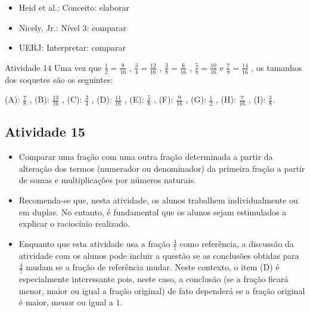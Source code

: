 \begin{multicols}{2}
\begin{itemize} %
    \item       Heid et al.: Conceito: elaborar
    \item       Nicely, Jr.: Nível 3: comparar
    \item       UERJ: Interpretar: comparar
\end{itemize} %

\begin{resposta*}{Atividade 14}
  Uma vez que   $\frac{1}{2} = \frac{8}{16}$  ,   $\frac{3}{4} = \frac{12}{16}$  
,   $\frac{3}{8} = \frac{6}{16}$  ,   $\frac{5}{8} = \frac{10}{16}$   e   
$\frac{7}{8} = \frac{14}{16}$  , os tamanhos dos soquetes são os seguintes:  
  
  (A):   $\frac{7}{8}$  ,  
  (B):   $\frac{13}{16}$  ,  
  (C):   $\frac{3}{4}$  ,   
  (D):   $\frac{11}{16}$  ,  
  (E):   $\frac{5}{8}$  ,  
  (F):   $\frac{9}{16}$  ,  
  (G):   $\frac{1}{2}$  ,  
  (H):   $\frac{7}{16}$  ,  
  (I):   $\frac{3}{8}$.  
\end{resposta*}



\subsection{Atividade 15}

\begin{itemize} %
    \item       Comparar uma fração com uma outra fração determinada a partir da 
alteração dos termos (numerador ou denominador) da primeira fração a partir de 
somas e multiplicações por números naturais.
\end{itemize} %
  
  
 
\begin{itemize} %
    \item       Recomenda-se que, nesta atividade, os alunos trabalhem 
individualmente ou em duplas. No entanto, é fundamental que os alunos sejam 
estimulados a explicar o raciocínio realizado.
    \item       Enquanto que esta atividade usa a fração       $\frac{4}{7}$     
  como referência, a discussão da atividade com os alunos pode incluir a questão 
se as conclusões obtidas para       $\frac{4}{7}$       mudam se a fração de 
referência mudar. Neste contexto, o item (D) é especialmente interessante pois, 
neste caso, a conclusão (se a fração ficará menor, maior ou igual a fração 
original) de fato dependerá se a fração original é maior, menor ou igual a       
$1$.
\end{itemize} %
  

\end{multicols}
